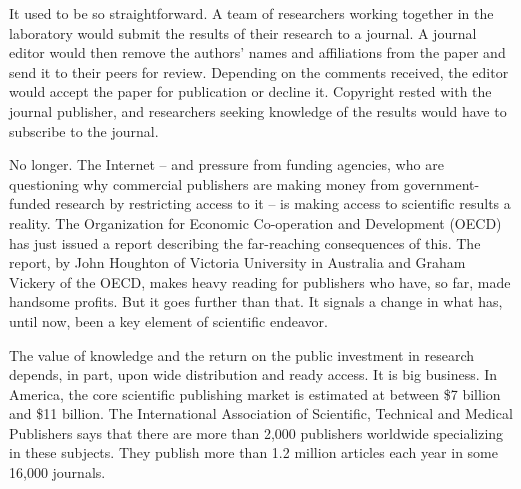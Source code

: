 \documentclass[a4paper]{article}
\begin{document}
\par
It used to be so straightforward. A team of researchers working together in the laboratory would submit the results of their research to a journal. A journal editor would then remove the authors’ names and affiliations from the paper and send it to their peers for review. Depending on the comments received, the editor would accept the paper for publication or decline it. Copyright rested with the journal publisher, and researchers seeking knowledge of the results would have to subscribe to the journal.

\par
No longer. The Internet – and pressure from funding agencies, who are questioning why commercial publishers are making money from government-funded research by restricting access to it – is making access to scientific results a reality. The Organization for Economic Co-operation and Development (OECD) has just issued a report describing the far-reaching consequences of this. The report, by John Houghton of Victoria University in Australia and Graham Vickery of the OECD, makes heavy reading for publishers who have, so far, made handsome profits. But it goes further than that. It signals a change in what has, until now, been a key element of scientific endeavor.

\par
The value of knowledge and the return on the public investment in research depends, in part, upon wide distribution and ready access. It is big business. In America, the core scientific publishing market is estimated at between \$7 billion and \$11 billion. The International Association of Scientific, Technical and Medical Publishers says that there are more than 2,000 publishers worldwide specializing in these subjects. They publish more than 1.2 million articles each year in some 16,000 journals.
\end{document}
